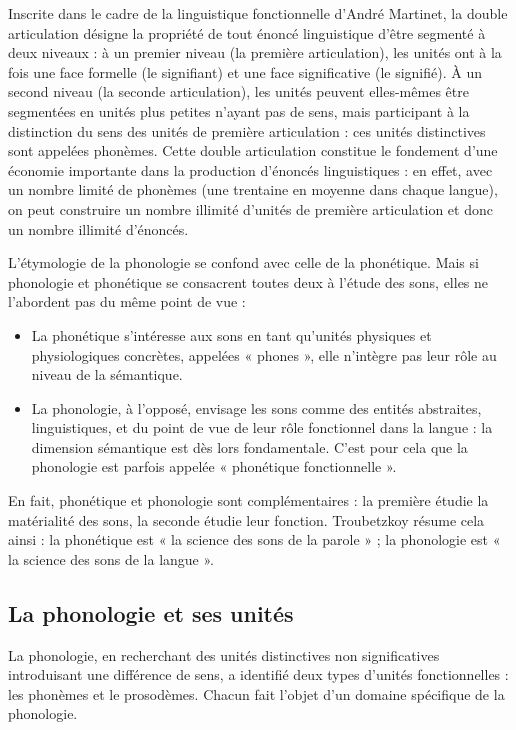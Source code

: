 Inscrite dans le cadre de la linguistique fonctionnelle d’André Martinet, la double articulation désigne la propriété de tout énoncé linguistique d’être segmenté à deux niveaux : à un premier niveau (la première articulation), les unités ont à la fois une face formelle (le signifiant) et une face significative (le signifié). À un second niveau (la seconde articulation), les unités peuvent elles-mêmes être segmentées en unités plus petites n’ayant pas de sens, mais participant à la distinction du sens des unités de première articulation : ces unités distinctives sont appelées phonèmes. Cette double articulation constitue le fondement d’une économie importante dans la production d’énoncés linguistiques : en effet, avec un nombre limité de phonèmes (une trentaine en moyenne dans chaque langue), on peut construire un nombre illimité d’unités de première articulation et donc un nombre illimité d’énoncés.

L’étymologie de la phonologie se confond avec celle de la phonétique. Mais si phonologie et phonétique se consacrent toutes deux à l’étude des sons, elles ne l’abordent pas du même point de vue :
\begin{itemize}
\item La phonétique s’intéresse aux sons en tant qu’unités physiques et physiologiques concrètes, appelées « phones », elle n’intègre pas leur rôle au niveau de la sémantique.
\item La phonologie, à l’opposé, envisage les sons comme des entités abstraites, linguistiques, et du point de vue de leur rôle fonctionnel dans la langue : la dimension sémantique est dès lors fondamentale. C’est pour cela que la phonologie est parfois appelée « phonétique fonctionnelle ».
\end{itemize}
En fait, phonétique et phonologie sont complémentaires : la première étudie la matérialité des sons, la seconde étudie leur fonction. Troubetzkoy résume cela ainsi : la phonétique est « la science des sons de la parole » ; la phonologie est « la science des sons de la langue ».

\subsection{La phonologie et ses unités}
La phonologie, en recherchant des unités distinctives non significatives introduisant une différence de sens, a identifié deux types d’unités fonctionnelles : les phonèmes et le prosodèmes. Chacun fait l’objet d’un domaine spécifique de la phonologie.

